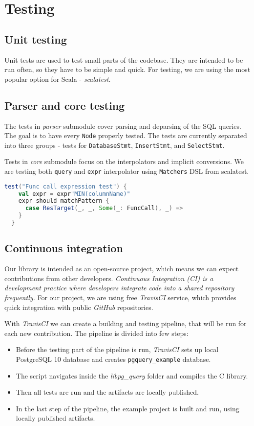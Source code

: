 \newpage
\section{Testing}
\subsection{Unit testing}
Unit tests are used to test small parts of the codebase. They are intended to be run often, so they have to be simple and quick. For testing, we are using the most popular option for Scala - \textit{scalatest}. 
\subsection{Parser and core testing}
The tests in \textit{parser} submodule cover parsing and deparsing of the SQL queries. The goal is to have every \texttt{Node} properly tested. The tests are currently separated into three groups - tests for \texttt{DatabaseStmt}, \texttt{InsertStmt}, and \texttt{SelectStmt}.

Tests in \textit{core} submodule focus on the interpolators and implicit conversions. We are testing both \texttt{query} and \texttt{expr} interpolator using \texttt{Matchers} DSL from scalatest.


\begin{lstlisting}[language=scala, basicstyle=\ttfamily, showstringspaces=false, caption={Test for expression with \texttt{FuncCall}}]
test("Func call expression test") {
    val expr = expr"MIN(columnName)"
    expr should matchPattern {
      case ResTarget(_, _, Some(_: FuncCall), _) =>
    }
  }
\end{lstlisting}
\subsection{Continuous integration}
Our library is intended as an open-source project, which means we can expect contributions from other developers. \textit{Continuous Integration (CI) is a development practice where developers integrate code into a shared repository frequently.}\cite{CI} For our project, we are using free \textit{TravisCI} service, which provides quick integration with public \textit{GitHub} repositories. 

With \textit{TravisCI} we can create a building and testing pipeline, that will be run for each new contribution. The pipeline is divided into few steps:
\begin{itemize}
    \item Before the testing part of the pipeline is run, \textit{TravisCI} sets up local PostgreSQL 10 database and creates \texttt{pgquery\_example} database.
    \item The script navigates inside the \textit{libpg\_query} folder and compiles the C library.
    \item Then all tests are run and the artifacts are locally published.
    \item In the last step of the pipeline, the example project is built and run, using locally published artifacts.
\end{itemize}